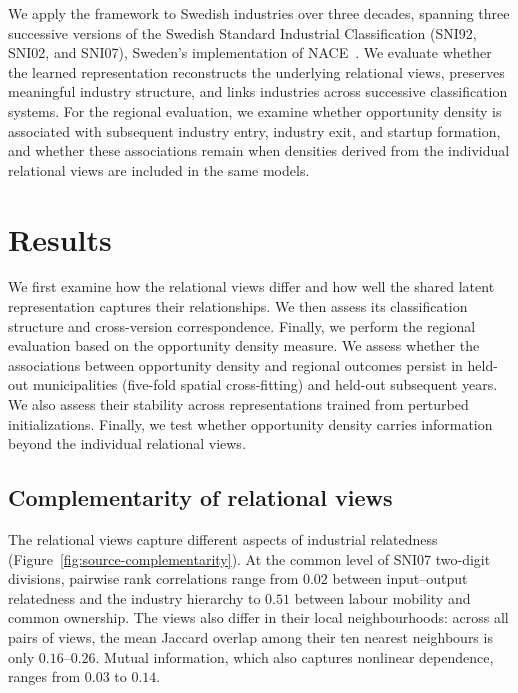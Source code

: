 \documentclass[9pt,twocolumn,twoside]{pnas-new}
\begin{document}
We apply the framework to Swedish industries over three decades, spanning three successive versions of the Swedish Standard Industrial Classification (SNI92, SNI02, and SNI07), Sweden's implementation of NACE~\cite{statisticsswedenscbMIS200722007,europeancommissionNACERev22008}. We evaluate whether the learned representation reconstructs the underlying relational views, preserves meaningful industry structure, and links industries across successive classification systems. For the regional evaluation, we examine whether opportunity density is associated with subsequent industry entry, industry exit, and startup formation, and whether these associations remain when densities derived from the individual relational views are included in the same models.

\section{Results}
\label{sec:results}
We first examine how the relational views differ and how well the shared latent representation captures their relationships. We then assess its classification structure and cross-version correspondence. Finally, we perform the regional evaluation based on the opportunity density measure. We assess whether the associations between opportunity density and regional outcomes persist in held-out municipalities (five-fold spatial cross-fitting) and held-out subsequent years. We also assess their stability across representations trained from perturbed initializations. Finally, we test whether opportunity density carries information beyond the individual relational views.

\subsection{Complementarity of relational views}
\label{sec:results-complementarity}

The relational views capture different aspects of industrial relatedness (Figure~\ref{fig:source-complementarity}). At the common level of SNI07 two-digit divisions, pairwise rank correlations range from $0.02$ between input--output relatedness and the industry hierarchy to $0.51$ between labour mobility and common ownership. The views also differ in their local neighbourhoods: across all pairs of views, the mean Jaccard overlap among their ten nearest neighbours is only $0.16$--$0.26$. Mutual information, which also captures nonlinear dependence, ranges from $0.03$ to $0.14$.
\end{document}
